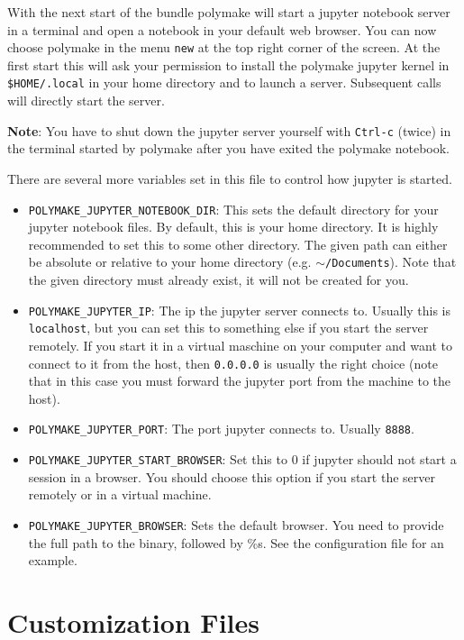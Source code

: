 \documentclass[a4paper]{amsart}
\begin{document}
With the next start of the bundle polymake will start a jupyter notebook server in a terminal and open a notebook in your default web browser. You can now choose polymake in the menu \texttt{new} at the top right corner of the screen. At the first start this will ask your permission to install the polymake jupyter kernel in \texttt{\$HOME/.local} in your home directory and to launch a server. Subsequent calls will directly start the server. 

\textbf{Note}: You have to shut down the jupyter server yourself with \texttt{Ctrl-c} (twice) in the terminal started by polymake after you have exited the polymake notebook. 

There are several more variables set in this file to control how jupyter is started.
\begin{itemize}
\item \texttt{POLYMAKE\_JUPYTER\_NOTEBOOK\_DIR}: This sets the default directory for your jupyter notebook files. By default, this is your home directory. It is highly recommended to set this to some other directory. The given path can either be absolute or relative to your home directory (e.g. \texttt{$\sim$/Documents}). Note that the given directory must already exist, it will not be created for you.
\item \texttt{POLYMAKE\_JUPYTER\_IP}: The ip the jupyter server connects to. Usually this is \texttt{localhost}, but you can set this to something else if you start the server remotely. If you start it in a virtual maschine on your computer and want to connect to it from the host, then \texttt{0.0.0.0} is usually the right choice (note that in this case you must forward the jupyter port from the machine to the host).
\item \texttt{POLYMAKE\_JUPYTER\_PORT}: The port jupyter connects to. Usually \texttt{8888}.
\item \texttt{POLYMAKE\_JUPYTER\_START\_BROWSER}: Set this to 0 if jupyter should not start a session in a browser. You should choose this option if you start the server remotely or in a virtual machine. 
\item \texttt{POLYMAKE\_JUPYTER\_BROWSER}: Sets the default browser. You need to provide the full path to the binary, followed by \%s. See the configuration file for an example.
\end{itemize}

\section*{Customization Files}
\end{document}
